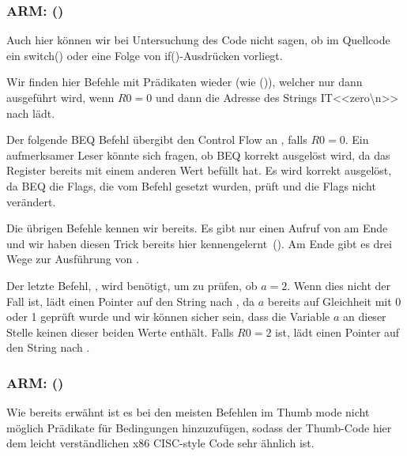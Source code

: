 \subsubsection{ARM: \OptimizingKeilVI (\ARMMode)}


Auch hier können wir bei Untersuchung des Code nicht sagen, ob im Quellcode ein switch() oder eine Folge von
if()-Ausdrücken vorliegt.


Wir finden hier Befehle mit Prädikaten wieder (wie \ADREQ ()), welcher nur dann ausgeführt wird, wenn $R0=0$
und dann die Adresse des Strings IT{<<zero\textbackslash{}n>>} nach  lädt.

Der folgende \ac{BEQ} Befehl übergibt den Control Flow an , falls $R0=0$.
Ein aufmerksamer Leser könnte sich fragen, ob \ac{BEQ} korrekt ausgelöst wird, da \ADREQ das  Register bereits
mit einem anderen Wert befüllt hat.
Es wird korrekt ausgelöst, da \ac{BEQ} die Flags, die vom \CMP Befehl gesetzt wurden, prüft und \ADREQ die Flags nicht
verändert.

Die übrigen Befehle kennen wir bereits.
Es gibt nur einen Aufruf von \printf am Ende und wir haben diesen Trick bereits hier
kennengelernt~(). Am Ende gibt es drei Wege zur Ausführung von \printf.

Der letzte Befehl, , wird benötigt, um zu prüfen, ob $a=2$.
Wenn dies nicht der Fall ist, lädt \ADRNE einen Pointer auf den String  nach
, da $a$ bereits auf Gleichheit mit 0 oder 1 geprüft wurde und wir können sicher sein, dass die Variable $a$ an
dieser Stelle keinen dieser beiden Werte enthält.
Falls $R0=2$ ist, lädt \ADREQ einen Pointer auf den String  nach . 

\subsubsection{ARM: \OptimizingKeilVI (\ThumbMode)}



Wie bereits erwähnt ist es bei den meisten Befehlen im Thumb mode nicht möglich Prädikate für Bedingungen hinzuzufügen,
sodass der Thumb-Code hier dem leicht verständlichen x86 \ac{CISC}-style Code sehr ähnlich ist.

